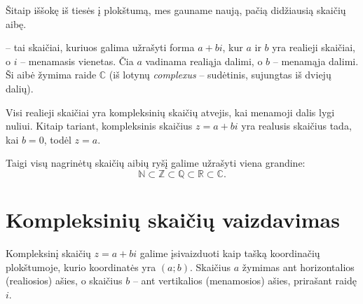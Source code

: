 \documentclass[11pt,a4paper]{scrartcl}
\begin{document}
Šitaip iššokę iš tiesės į plokštumą, mes gauname naują, pačią didžiausią skaičių aibę. 

\begin{definition}
 -- tai skaičiai, kuriuos galima užrašyti forma $ a + bi$, kur $a$ ir $b$ yra realieji skaičiai, o $i$ -- menamasis vienetas. Čia $a$ vadinama realiąja dalimi, o $b$ -- menamąja dalimi. Ši aibė žymima raide $\mathbb{C}$ (iš lotynų \textit{complexus} -- sudėtinis, sujungtas iš dviejų dalių).
\end{definition}

Visi realieji skaičiai yra kompleksinių skaičių atvejis, kai menamoji dalis lygi nuliui. Kitaip tariant, kompleksinis skaičius $z=a+bi$ yra realusis skaičius tada, kai $b=0$, todėl $z=a$.

Taigi visų nagrinėtų skaičių aibių ryšį galime užrašyti viena grandine:
\[ \mathbb{N} \subset \mathbb{Z} \subset \mathbb{Q} \subset \mathbb{R} \subset \mathbb{C}. \]

\section{Kompleksinių skaičių vaizdavimas}

Kompleksinį skaičių $z = a + bi$ galime įsivaizduoti kaip tašką koordinačių plokštumoje, kurio koordinatės yra $(a; b)$. 
Skaičius $a$ žymimas ant horizontalios (realiosios) ašies, o skaičius $b$ -- ant vertikalios (menamosios) ašies, prirašant raidę $i$.
\end{document}
